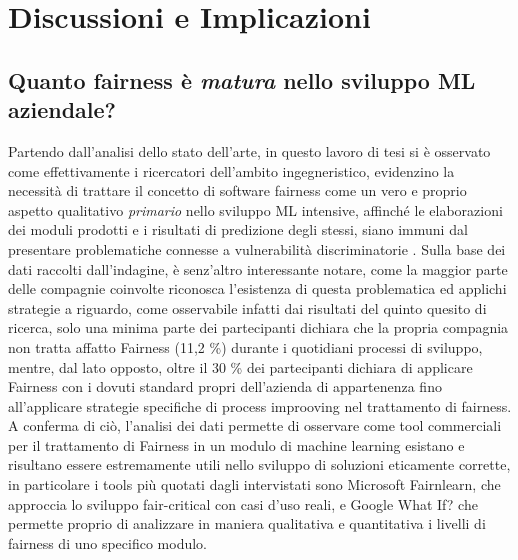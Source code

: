     
    
    \section{Discussioni e Implicazioni}
    
    \subsection{Quanto fairness è \emph{matura} nello sviluppo ML aziendale?}
    Partendo dall'analisi dello stato dell'arte, in questo lavoro di tesi si è osservato come effettivamente i ricercatori dell'ambito ingegneristico, evidenzino la necessità di trattare il concetto di software fairness come un vero e proprio aspetto qualitativo \emph{primario} nello sviluppo ML intensive, affinché le elaborazioni dei moduli prodotti e i risultati di predizione degli stessi, siano immuni dal presentare problematiche connesse a vulnerabilità discriminatorie \cite{brun2018software}. Sulla base dei dati raccolti dall'indagine, è senz'altro interessante notare, come la maggior parte delle compagnie coinvolte riconosca l'esistenza di questa problematica ed applichi strategie a riguardo, come osservabile infatti dai risultati del quinto quesito di ricerca, solo una minima parte dei partecipanti dichiara che la propria compagnia non tratta affatto Fairness (11,2 \%) durante i quotidiani processi di sviluppo, mentre, dal lato opposto, oltre il 30 \% dei partecipanti dichiara di 
    applicare Fairness con i dovuti standard propri dell'azienda di appartenenza fino all'applicare strategie specifiche di process improoving nel trattamento di fairness. A conferma di ciò, l'analisi dei dati permette di osservare come tool commerciali per il trattamento di Fairness in un modulo di machine learning esistano e risultano essere estremamente utili nello sviluppo di soluzioni eticamente corrette, in particolare i tools più quotati dagli intervistati sono  Microsoft Fairnlearn, che approccia lo sviluppo fair-critical con casi d'uso reali, e Google What If? che permette proprio di analizzare in maniera qualitativa e quantitativa i livelli di fairness di uno specifico modulo.\\
    
    
